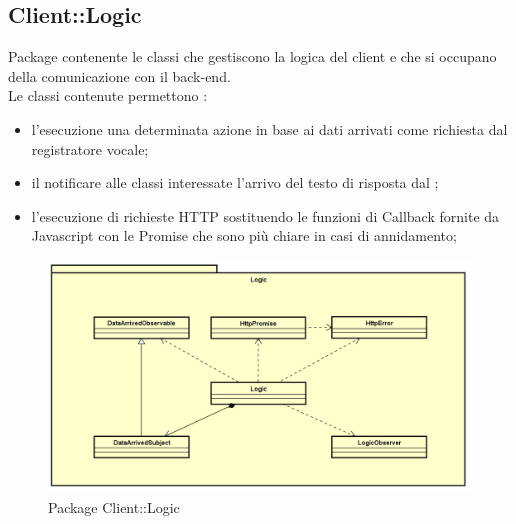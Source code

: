 \subsection{Client::Logic}
Package contenente le classi che gestiscono la logica del client e che si occupano della comunicazione con il back-end.\\ Le classi contenute permettono : \begin{itemize} \item l'esecuzione una determinata azione in base ai dati arrivati come richiesta dal registratore vocale; \item il notificare alle classi interessate l'arrivo del testo di risposta dal ; \item l'esecuzione di richieste HTTP sostituendo le funzioni di Callback fornite da Javascript con le Promise che sono più chiare in casi di annidamento; \end{itemize}
\begin{figure}[h] \centering \includegraphics[width=\textwidth,height=\textheight,keepaspectratio]{images/diagrams/client/Client/Logic.png}
	\caption{Package Client::Logic}
\end{figure}
\newpage


